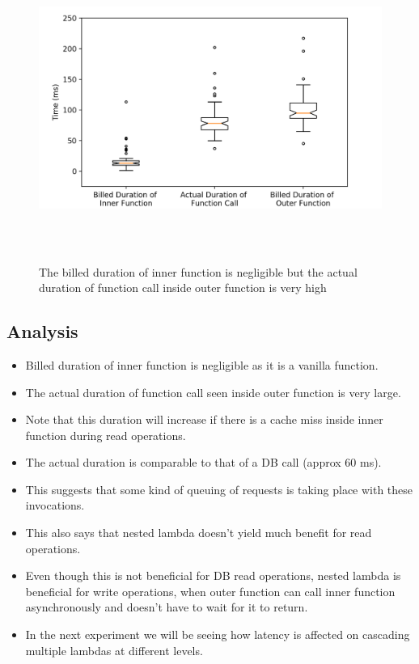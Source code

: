 \begin{figure}[ht]
\centering
\includegraphics[height=10cm]{Images/4nested.png}
\caption{The billed duration of inner function is negligible but the actual duration of function call inside outer function is very high}
\end{figure}

\subsection{Analysis}

\begin{itemize}
    \item Billed duration of inner function is negligible as it is a vanilla function.
    \item The actual duration of function call seen inside outer function is very large. 
    \item Note that this duration will increase if there is a cache miss inside inner function during read operations.
    \item The actual duration is comparable to that of a DB call (approx 60 ms). 
    \item This suggests that some kind of queuing of requests is taking place with these invocations. 
    \item This also says that nested lambda doesn’t yield much benefit for read operations.
    \item Even though this is not beneficial for DB read operations, nested lambda is beneficial for write operations, when outer function can call inner function asynchronously and doesn’t have to wait for it to return.
    \item In the next experiment we will be seeing how latency is affected on cascading multiple lambdas at different levels.
\end{itemize}

